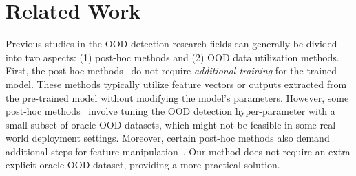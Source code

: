 \documentclass[letterpaper]{article} %
\begin{document}

\section{Related Work}
Previous studies in the OOD detection research fields can generally be divided into two aspects: (1) post-hoc methods and (2) OOD data utilization methods.
First, the post-hoc methods~\cite{odin,entropy,energy,KLmatchingLogits,vim,mahalanobis,MaxLigit,DICE,RMD} do not require \textit{additional training} for the trained model.
These methods typically utilize feature vectors or outputs extracted
from the pre-trained model without modifying the model's parameters.
However, some post-hoc methods~\cite{mahalanobis} involve tuning the OOD detection hyper-parameter with a small subset of oracle OOD datasets, which might not be feasible in some real-world deployment settings.
Moreover, certain post-hoc methods also demand additional steps for feature manipulation~\cite{KLmatchingLogits,mahalanobis}.
Our method does not require an extra explicit oracle OOD dataset, providing a more practical solution.
\end{document}
